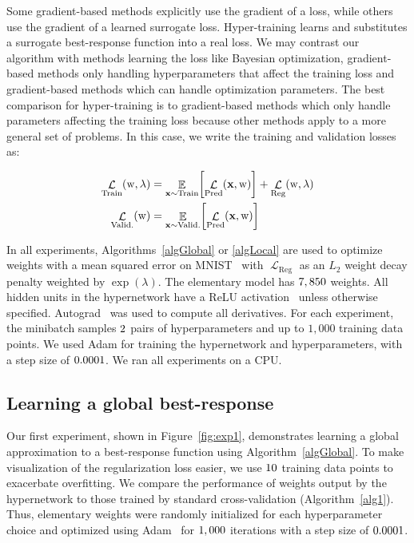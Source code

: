 \documentclass{article} %
\newcommand{\param}{\mathrm{w}} %
\newcommand{\hyper}{\lambda} %
\newcommand{\hyperHyper}{\hyper'} %
\newcommand{\lossSymbol}{\mathop{\mathcal{L}}} %
\newcommand{\lossSymbolInner}{\lossSymbol_{\mathrm{Train}}} %
\newcommand{\lossSymbolOuter}{\lossSymbol_{\mathrm{Valid.}}} %
\newcommand{\innerLoss}[2]{\lossSymbolInner \! \left( #1, #2 \right)} %
\newcommand{\outerLoss}[1]{\lossSymbolOuter \! \left( #1 \right)}%
\newcommand{\predictionLoss}[2]{\lossSymbol_{\mathrm{Pred}} ( #1, #2 )} %
\newcommand{\regLoss}[2]{\lossSymbol_{\mathrm{Reg}} ( #1, #2 )}%
\newcommand{\variableData}{\bf{x}} %
\newcommand{\ETrain}[1]{\mathop{\mathbb{E}}_{\variableData \sim \mathrm{Train}} \! \left[ #1 \right]}
\newcommand{\EValid}[1]{\mathop{\mathbb{E}}_{\variableData \sim \mathrm{Valid.}} \! \left[ #1 \right]}
\newcommand{\innerLossEExpand}[2]{\ETrain{\predictionLoss{\variableData}{#1}} + \regLoss{#1}{#2}} %
\newcommand{\outerLossEExpand}[1]{\EValid{\predictionLoss{\variableData}{#1}}} %
\begin{document}
Some gradient-based methods explicitly use the gradient of a loss, while others use the gradient of a learned surrogate loss.
Hyper-training learns and substitutes a surrogate best-response function into a real loss.
We may contrast our algorithm with methods learning the loss like Bayesian optimization, gradient-based methods only handling hyperparameters that affect the training loss and gradient-based methods which can handle optimization parameters.
The best comparison for hyper-training is to gradient-based methods which only handle parameters affecting the training loss because other methods apply to a more general set of problems.
In this case, we write the training and validation losses as:

\begin{align*}
\innerLoss{\param}{\hyper} &= \innerLossEExpand{\param}{\hyper} \\
\outerLoss{\param} &= \outerLossEExpand{\param}
\end{align*}

In all experiments, Algorithms~\ref{algGlobal} or \ref{algLocal} are used to optimize weights with a mean squared error on MNIST~\citep{lecun1998gradient} with $\lossSymbol_{\mathrm{Reg}}$ as an $L_{2}$ weight decay penalty weighted by $\exp(\hyper)$.
The elementary model has $7,850$ weights.
All hidden units in the hypernetwork have a ReLU activation~\citep{nair2010rectified} unless otherwise specified.
Autograd~\citep{maclaurin2015autograd} was used to compute all derivatives.
For each experiment, the minibatch samples $2$ pairs of hyperparameters and up to $1,000$ training data points.
We used Adam for training the hypernetwork and hyperparameters, with a step size of $0.0001$.
We ran all experiments on a CPU.

\subsection{Learning a global best-response}
Our first experiment, shown in Figure~\ref{fig:exp1}, demonstrates learning a global approximation to a best-response function using Algorithm~\ref{algGlobal}.
To make visualization of the regularization loss easier, we use $10$ training data points to exacerbate overfitting.
We compare the performance of weights output by the hypernetwork to those trained by standard cross-validation (Algorithm~\ref{alg1}).
Thus, elementary weights were randomly initialized for each hyperparameter choice and optimized using Adam~\citep{kingma2014adam} for $1,000$ iterations with a step size of $0.0001$.
\end{document}
